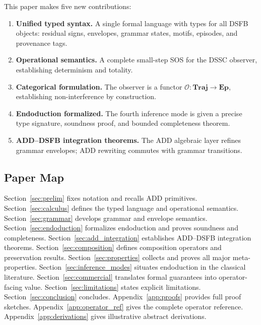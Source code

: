 \documentclass[11pt,a4paper]{article}
\theoremstyle{plain}
\theoremstyle{definition}
\theoremstyle{remark}
\newcommand{\Traj}{\mathbf{Traj}}
\newcommand{\Ep}{\mathbf{Ep}}
\newcommand{\Obs}{\mathcal{O}}
\begin{document}
This paper makes five new contributions:
\begin{enumerate}[nosep]
  \item \textbf{Unified typed syntax.} A single formal language with types for all DSFB objects:
    residual signs, envelopes, grammar states, motifs, episodes, and provenance tags.
  \item \textbf{Operational semantics.} A complete small-step SOS for the DSSC observer,
    establishing determinism and totality.
  \item \textbf{Categorical formulation.} The observer is a functor
    $\Obs : \Traj \to \Ep$, establishing non-interference by construction.
  \item \textbf{Endoduction formalized.} The fourth inference mode is given a precise type
    signature, soundness proof, and bounded completeness theorem.
  \item \textbf{ADD--DSFB integration theorems.} The ADD algebraic layer refines grammar
    envelopes; ADD rewriting commutes with grammar transitions.
\end{enumerate}

\subsection{Paper Map}

Section~\ref{sec:prelim} fixes notation and recalls ADD primitives.
Section~\ref{sec:calculus} defines the typed language and operational semantics.
Section~\ref{sec:grammar} develops grammar and envelope semantics.
Section~\ref{sec:endoduction} formalizes endoduction and proves soundness and completeness.
Section~\ref{sec:add_integration} establishes ADD--DSFB integration theorems.
Section~\ref{sec:composition} defines composition operators and preservation results.
Section~\ref{sec:properties} collects and proves all major meta-properties.
Section~\ref{sec:inference_modes} situates endoduction in the classical literature.
Section~\ref{sec:commercial} translates formal guarantees into operator-facing value.
Section~\ref{sec:limitations} states explicit limitations.
Section~\ref{sec:conclusion} concludes.
Appendix~\ref{app:proofs} provides full proof sketches.
Appendix~\ref{app:operator_ref} gives the complete operator reference.
Appendix~\ref{app:derivations} gives illustrative abstract derivations.

\end{document}
